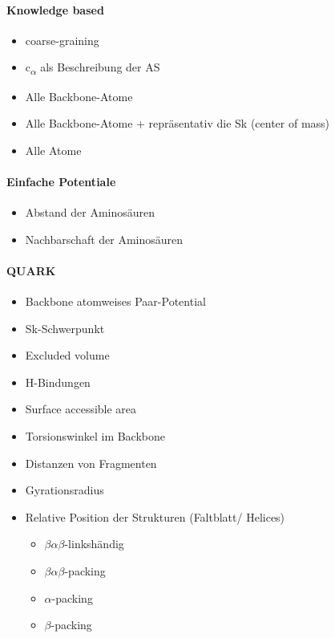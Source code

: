 \paragraph{Knowledge based}
\begin{itemize}
 \item coarse-graining
 \item c\textsubscript{$\alpha$} als Beschreibung der AS
 \item Alle Backbone-Atome
 \item Alle Backbone-Atome + repräsentativ die Sk (center of mass)
 \item Alle Atome
\end{itemize}

\paragraph{Einfache Potentiale}
\begin{itemize}
  \item Abstand der Aminosäuren
  \item Nachbarschaft der Aminosäuren
\end{itemize}

\paragraph{QUARK}
\begin{itemize}
  \item Backbone atomweises Paar-Potential
  \item Sk-Schwerpunkt
  \item Excluded volume
  \item H-Bindungen
  \item Surface accessible area
  \item Torsionswinkel im Backbone
  \item Distanzen von Fragmenten
  \item Gyrationsradius
  \item Relative Position der Strukturen (Faltblatt/ Helices)
  \begin{itemize}
    \item $\beta \alpha \beta$-linkshändig
    \item $\beta \alpha \beta$-packing
    \item $\alpha$-packing
    \item $\beta$-packing
  \end{itemize}
\end{itemize}

